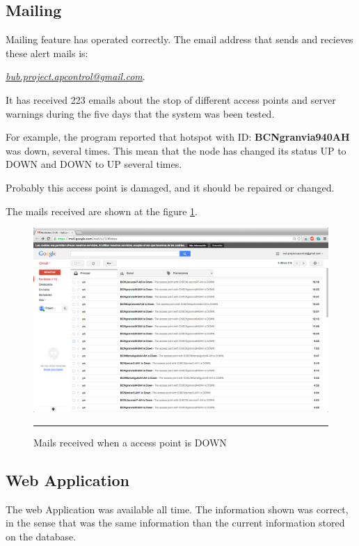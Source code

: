 \documentclass[12pt, a4paper,twoside]{tesi_upf}
\begin{document}
    \subsection {Mailing}
Mailing feature has operated correctly. The email address that sends and recieves these alert mails is: {\emph{\href{mailto:bub.project.apcontrol@gmail.com}{bub.project.apcontrol@gmail.com}}.

It has received 223 emails about the stop of different access points and server warnings during the five days that the system was been tested.
    
    For example, the program reported that hotspot with ID: \textbf{BCNgranvia940AH} was down, several times. This mean that the node has changed its status UP to DOWN and DOWN to UP several times. 
    
    Probably this access point is damaged, and it should be repaired or changed.
    
    The mails received are shown at the figure \ref{fig:mail}.\\
    
        \begin{figure}[htbp]
          \centering
              \includegraphics[scale=0.3]{./figures/mails.png}
              \rule{32em}{0.5pt}
            \caption[Mails received when a access point is DOWN]{Mails received when a access point is DOWN}
            \label{fig:mail}
        \end{figure}
    
    \subsection{Web Application}
    The web Application was available all time. The information shown was correct, in the sense that was the same information than the current information stored on the database.
    
}
\end{document}
